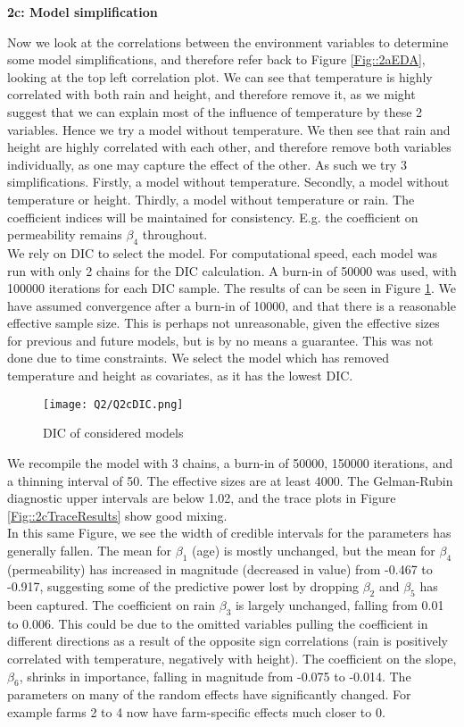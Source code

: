 \documentclass[11pt]{article}
\begin{document}
\textbf{2c: Model simplification} \label{sec::2c}

Now we look at the correlations between the environment variables to determine some model simplifications, and therefore refer back to Figure \ref{Fig::2aEDA}, looking at the top left correlation plot. We can see that temperature is highly correlated with both rain and height, and therefore remove it, as we might suggest that we can explain most of the influence of temperature by these 2 variables. Hence we try a model without temperature. We then see that rain and height are highly correlated with each other, and therefore remove both variables individually, as one may capture the effect of the other. As such we try 3 simplifications. Firstly, a model without temperature. Secondly, a model without temperature or height. Thirdly, a model without temperature or rain. The coefficient indices will be maintained for consistency. E.g. the coefficient on permeability remains $\beta_4$ throughout. \\
We rely on DIC to select the model. For computational speed, each model was run with only 2 chains for the DIC calculation. A burn-in of 50000 was used, with 100000 iterations for each DIC sample. The results of can be seen in Figure \ref{Fig::2cDIC}. We have assumed convergence after a burn-in of 10000, and that there is a reasonable effective sample size. This is perhaps not unreasonable, given the effective sizes for previous and future models, but is by no means a guarantee. This was not done due to time constraints. We select the model which has removed temperature and height as covariates, as it has the lowest DIC. 

\begin{figure}[!h]
\centering
\texttt{[image: Q2/Q2cDIC.png]}
\caption{DIC of considered models} \label{Fig::2cDIC}
\end{figure}

\vspace{-4mm}

We recompile the model with 3 chains, a burn-in of 50000, 150000 iterations, and a thinning interval of 50. The effective sizes are at least 4000. The Gelman-Rubin diagnostic upper intervals are below 1.02, and the trace plots in Figure \ref{Fig::2cTraceResults} show good mixing. \\
In this same Figure, we see the width of credible intervals for the parameters has generally fallen. The mean for $\beta_1$ (age) is mostly unchanged, but the mean for $\beta_4$ (permeability) has increased in magnitude (decreased in value) from -0.467 to -0.917, suggesting some of the predictive power lost by dropping $\beta_2$ and $\beta_5$ has been captured. The coefficient on rain $\beta_3$ is largely unchanged, falling from 0.01 to 0.006. This could be due to the omitted variables pulling the coefficient in different directions as a result of the opposite sign correlations (rain is positively correlated with temperature, negatively with height). The coefficient on the slope, $\beta_6$, shrinks in importance, falling in magnitude from -0.075 to -0.014. The parameters on many of the random effects have significantly changed. For example farms 2 to 4 now have farm-specific effects much closer to 0. 
\end{document}
